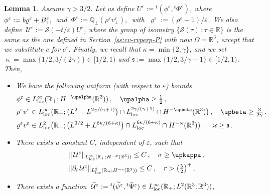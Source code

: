 \documentclass[11pt,reqno]{amsart}
\newtheorem{lemma}{Lemma}
\def \R{{\mathbb{R}}}
\def \Q{{\mathbb{Q}}}
\newcommand{\myparallel}{{\mkern3mu\vphantom{\perp}\vrule depth 0pt\mkern2mu\vrule depth 0pt\mkern3mu}}
\begin{document}
\begin{lemma}
  \label{lem:auxilR}
  Assume $\gamma >3/2$. Let us define  $U^\varepsilon:={}^t(\phi^\varepsilon, {}^t\Phi^\varepsilon)$, where $\phi^\varepsilon := b \varrho^\varepsilon + B_\myparallel^\varepsilon,\,$ and $\ \Phi^\varepsilon:=\Q_\perp(\rho^\varepsilon v_\perp^\varepsilon),\,$  with $\ \varrho^\varepsilon:= (\rho^\varepsilon-1)/\varepsilon\, $. We also define $\, \mathcal U^\varepsilon := \mathcal S (-t/\varepsilon)  U^\varepsilon$, where the group of isometry $\{ \mathcal S(\tau)\,; \tau \in \R \}$ is the same as the one defined in Section~\ref{ss:cv-rvperp-P} with now $\Omega=\R^3$, except that we substitute $c$ for  $c^\varepsilon$. Finally, we recall that $\kappa = \min\{2,\gamma\}$, and we set $\upkappa= \max\{1/2,3/(2\gamma)\} \in [1/2,1)$ and $\mathfrak s:=\max\{1/2,3/\gamma -1 \} \in [1/2,1)$. Then,
\begin{itemize}
  \item[1.] We have the following uniform (with respect to $\varepsilon$) bounds
    \begin{align}
      & \phi^\varepsilon \in  L_{\rm loc}^\infty(\R_+; H^{-\upalpha}(\R^3))\,, \quad \upalpha \geq \tfrac12\,, \label{eqlem:AUXR1} \\
      & \rho^\varepsilon v^\varepsilon  \in  L_{\rm loc}^\infty\big(\R_+; \big(L^2+L^{2\gamma/(\gamma+1)}\big)\cap L_{\rm loc}^{2\gamma/(\gamma +1)} \cap H^{-\upbeta}(\R^3)\big)\,,
      \quad \upbeta \geq \tfrac{3}{2\gamma}\,.   \label{eqlem:AUXR2} \\
       & \varrho^\varepsilon v^\varepsilon  \in  L_{\rm loc}^2\big(\R_+; \big(L^{3/2}+L^{6\kappa/(6+\kappa)}\big)\cap L_{\rm loc}^{6\kappa/(6+\kappa)} \cap H^{-\varkappa}(\R^3)\big)\,,
      \quad \varkappa \geq \mathfrak s \,.   \label{eqlem:AUXR2bis}
    \end{align}
  \item[2.] There exists a constant $C$, independent of $\varepsilon$, such that
  \begin{align}
    & \| \, \mathcal U^\varepsilon\|_{L_{\rm loc}^\infty(\R_+; H^{-\sigma}(\R^3))} \leq C\,, \quad  \sigma \geq \upkappa\,, \label{eqlem:AUXR3} \\
      &  \| \partial_t\, \mathcal U^\varepsilon\|_{L_{\rm loc}^2(\R_+; H^{-r}(\R^3))} \leq C\,, \quad r> \big(\tfrac{5}{2}\big)^+\,,   \label{eqlem:AUXR4} 
  \end{align}
\item[3.] There exists a function $\,\widetilde{\mathcal U}^\varepsilon:={}^t(\widetilde{\psi}^\varepsilon, {}^t\widetilde{\Psi}^\varepsilon) \in L_{\rm loc}^\infty(\R_+;L^2(\R^3;\R^3))$,

\end{itemize}
\end{lemma}
\end{document}
